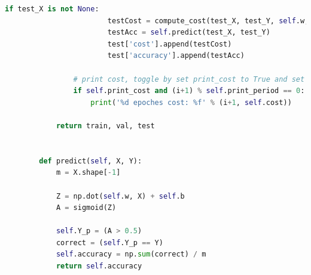 \documentclass{article}
\begin{document}
\begin{lstlisting}[language=Python, breaklines]
	                if test_X is not None:
	                    testCost = compute_cost(test_X, test_Y, self.w, self.b, self.lambd, self.regularized)
	                    testAcc = self.predict(test_X, test_Y)
	                    test['cost'].append(testCost)
	                    test['accuracy'].append(testAcc)
	
	            # print cost, toggle by set print_cost to True and set print period
	            if self.print_cost and (i+1) % self.print_period == 0:
	                print('%d epoches cost: %f' % (i+1, self.cost))
	
	        return train, val, test
	
	
	    def predict(self, X, Y):
	        m = X.shape[-1]
	
	        Z = np.dot(self.w, X) + self.b
	        A = sigmoid(Z)
	
	        self.Y_p = (A > 0.5)
	        correct = (self.Y_p == Y)
	        self.accuracy = np.sum(correct) / m
	        return self.accuracy
	

\end{lstlisting}
\newpage
\end{document}
